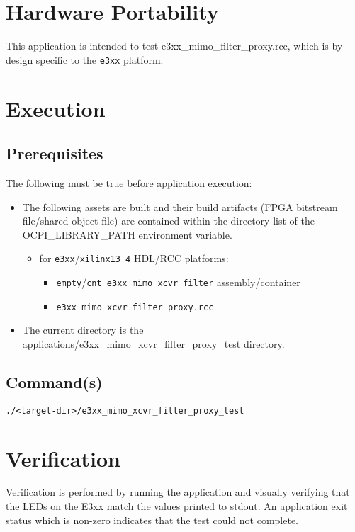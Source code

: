 \section{Hardware Portability}
This application is intended to test e3xx\_mimo\_filter\_proxy.rcc, which is by design specific to the \verb+e3xx+ platform.

\section{Execution}
\subsection{Prerequisites}
The following must be true before application execution:
\begin{itemize}
  \item The following assets are built and their build artifacts (FPGA bitstream file/shared object file) are contained within the directory list of the OCPI\_LIBRARY\_PATH environment variable.
  \begin{itemize}
    \item for \verb+e3xx+/\verb+xilinx13_4+ HDL/RCC platforms:
    \begin{itemize}
      \item \verb+empty+/\verb+cnt_e3xx_mimo_xcvr_filter+ assembly/container
      \item \verb+e3xx_mimo_xcvr_filter_proxy.rcc+
    \end{itemize}
  \end{itemize}
\item The current directory is the applications/e3xx\_mimo\_xcvr\_filter\_proxy\_test directory.
\end{itemize}
\subsection{Command(s)}
\begin{lstlisting}
./<target-dir>/e3xx_mimo_xcvr_filter_proxy_test
\end{lstlisting}
\section{Verification}
Verification is performed by running the application and visually verifying that the LEDs on the E3xx match the values printed to stdout. An application exit status which is non-zero indicates that the test could not complete.



